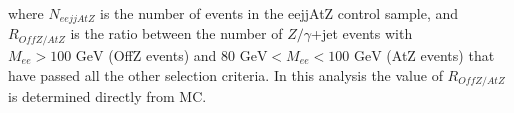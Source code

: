 \documentclass{cmspaper}
\begin{document}
\begin{linenumbers}
where $N_{eejjAtZ}$ is the number of events in the eejjAtZ control sample, and 
$R_{OffZ/AtZ}$ is the ratio between the number of $Z/\gamma$+jet events 
with $M_{ee} > 100\mbox{ GeV}$ (OffZ events) and $80\mbox{ GeV} < M_{ee} < 100\mbox{ GeV}$ 
(AtZ events) that have passed all the other selection criteria.
In this analysis the value of $R_{OffZ/AtZ}$ is determined directly from MC.
%

\end{linenumbers}
\end{document}
